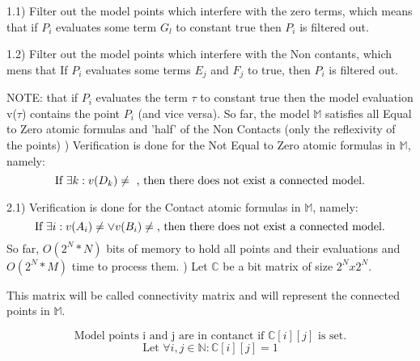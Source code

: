 \documentclass{article}
\begin{document}
			1.1) Filter out the model points which interfere with the zero terms, 
			which means that if $P_i$ evaluates some term $G_l$ to constant true then $P_i$ is filtered out.
			\newline

			1.2) Filter out the model points which interfere with the Non contants, which mens that 
				If $P_i$ evaluates some terms $E_j$ and $F_j$ to true, then $P_i$ is filtered out.
			\newline

			NOTE: that if $P_i$ evaluates the term $\tau$ to constant true then the model 
			evaluation v($\tau$) contains the point $P_i$ (and vice versa).
			\newline
			\newline
		So far, the model $\mathbb{M}$ satisfies all Equal to Zero atomic formulas and 
		'half' of the Non Contacts (only the reflexivity of the points)
			\newline
			) Verification is done for the Not Equal to Zero atomic formulas in $\mathbb{M}$, namely:
			\begin{equation}
				\text{If  } \exists k: v(D_k) \neq \empty \text{ , then there does not exist a connected model.}
			\end{equation}

		2.1) Verification is done for the Contact atomic formulas in $\mathbb{M}$, namely:
			\begin{equation}
				\text{If  } \exists i: v(A_i) \neq \empty \vee v(B_i) \neq \empty \text{, then there does not exist a connected model.}
			\end{equation}
			\newline
			\newline	
		So far, $O(2^N * N)$ bits of memory to hold all points and 
		their evaluations and $O(2^N * M)$ time to process them.
			\newline
			) Let $\mathbb{C}$ be a bit matrix of size $2^N x 2^N$.
			\newline
			
			This matrix will be called connectivity matrix and will represent the connected points in $\mathbb{M}$.
			
			\begin{equation}
				\text{Model points i and j are in contanct if } \mathbb{C}[ i ][ j ] \text{ is set.}
			\end{equation}
			\begin{equation}
				\text{Let } \forall i, j \in \mathbb{N} : \mathbb{C}[ i ][ j ] = 1
			\end{equation}
\end{document}

